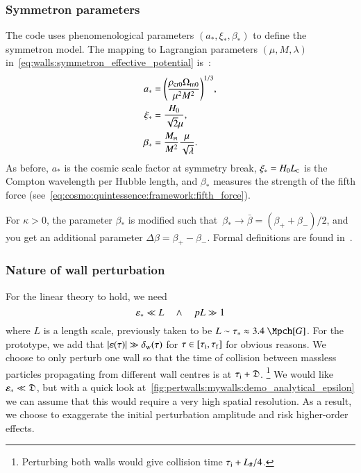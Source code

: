 \subsubsection{Symmetron parameters}
    The code uses phenomenological parameters $(a_\ast, \xi_\ast, \beta_\ast)$ to define the symmetron model. The mapping to Lagrangian parameters $(\mu, M, \lambda)$ in~\cref{eq:walls:symmetron_effective_potential} is~\citep{christiansenAsevolutionRelativisticNbody2023}:
    \begin{subequations}\label{eq:PT:sims:mapping_symmetron_params}
        \begin{align}
            a_\ast &=  {\left( \frac{\rho_\mathrm{cr0} \Omega_\mathrm{m0}}{\mu^2 M^2} \right)}^{1/3},\\
            \xi_\ast &= \frac{H_0}{\sqrt{2}\mu}, \\
            \beta_\ast &=\frac{M_{\text{\tiny{Pl}}}}{M^2} \frac{\mu}{\sqrt{\lambda}}.
        \end{align}
    \end{subequations}
    As before, $a_\ast$ is the cosmic scale factor at symmetry break, $\xi_\ast= H_0 L_{\text{\tiny{C}}}$ is the Compton wavelength per Hubble length, and $\beta_\ast$ measures the strength of the fifth force (see~\cref{eq:cosmo:quintessence:framework:fifth_force}). %

    For $\kappa>0$, the parameter $\beta_\ast$ is modified such that~$\beta_\ast \to \bar{\beta}= (\beta_+ + \beta_-)/2$, and you get an additional parameter $\Delta \beta = \beta_+- \beta_-$. Formal definitions are found in~\citet{christiansenAsevolutionRelativisticNbody2023}. %


\subsubsection{Nature of wall perturbation}
    For the linear theory to hold, we need%
    \begin{equation}\label{eq:PT:sims:linearity_constraints}
        \varepsilon_\ast \ll L \quad \land \quad pL \gg 1
    \end{equation}
    where $L$ is a length scale, previously taken to be $L\sim \tau_\ast\approx 3.4~\Mpch[G]$. For the prototype, we add that $\abs{\varepsilon(\tau)} \gg \delta_\mathrm{w}(\tau)$ for $\tau\in[\tau_\mathrm{i}, \tau_\mathrm{f}]$ for obvious reasons. %
    We choose to only perturb one wall so that the time of collision between massless particles propagating from different wall centres is at $ \tau_\mathrm{i} + \mathfrak{D}$.%
    \footnote{
        Perturbing both walls would give collision time $\tau_\mathrm{i} + L_{\#}/4$.
    } %
    We would like $\varepsilon_\ast \ll \mathfrak{D}$, but with a quick look at~\cref{fig:pertwalls:mywalls:demo_analytical_epsilon} we can assume that this would require a very high spatial resolution. As a result, we choose to exaggerate the initial perturbation amplitude and risk higher-order effects. %

